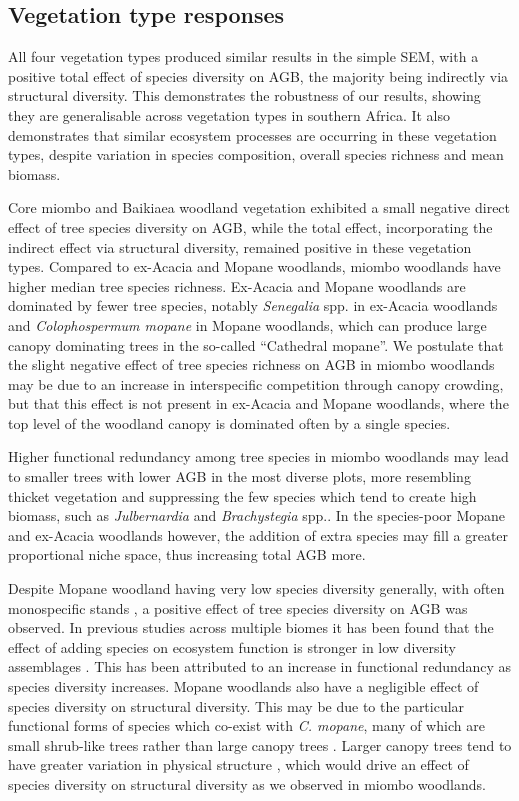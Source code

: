 \begin{refsection}
\subsection{Vegetation type responses}
\label{befr:ssec:veg_type_response}

All four vegetation types produced similar results in the simple SEM, with a positive total effect of species diversity on AGB, the majority being indirectly via structural diversity. This demonstrates the robustness of our results, showing they are generalisable across vegetation types in southern Africa. It also demonstrates that similar ecosystem processes are occurring in these vegetation types, despite variation in species composition, overall species richness and mean biomass.

Core miombo and Baikiaea woodland vegetation exhibited a small negative direct effect of tree species diversity on AGB, while the total effect, incorporating the indirect effect via structural diversity, remained positive in these vegetation types. Compared to ex-Acacia and Mopane woodlands, miombo woodlands have higher median tree species richness. Ex-Acacia and Mopane woodlands are dominated by fewer tree species, notably \textit{Senegalia} spp. in ex-Acacia woodlands and \textit{Colophospermum mopane} in Mopane woodlands, which can produce large canopy dominating trees in the so-called ``Cathedral mopane''. We postulate that the slight negative effect of tree species richness on AGB in miombo woodlands may be due to an increase in interspecific competition through canopy crowding, but that this effect is not present in ex-Acacia and Mopane woodlands, where the top level of the woodland canopy is dominated often by a single species. 

Higher functional redundancy among tree species in miombo woodlands may lead to smaller trees with lower AGB in the most diverse plots, more resembling thicket vegetation and suppressing the few species which tend to create high biomass, such as \textit{Julbernardia} and \textit{Brachystegia} spp.. In the species-poor Mopane and ex-Acacia woodlands however, the addition of extra species may fill a greater proportional niche space, thus increasing total AGB more. 

Despite Mopane woodland having very low species diversity generally, with often monospecific stands \citep{Timberlake2010}, a positive effect of tree species diversity on AGB was observed. In previous studies across multiple biomes it has been found that the effect of adding species on ecosystem function is stronger in low diversity assemblages \citep{Cardinale2006, Srivastava2005}. This has been attributed to an increase in functional redundancy as species diversity increases. Mopane woodlands also have a negligible effect of species diversity on structural diversity. This may be due to the particular functional forms of species which co-exist with \textit{C. mopane}, many of which are small shrub-like trees rather than large canopy trees \citep{Timberlake2010}. Larger canopy trees tend to have greater variation in physical structure \citep{Seidel2019}, which would drive an effect of species diversity on structural diversity as we observed in miombo woodlands.


\end{refsection}

